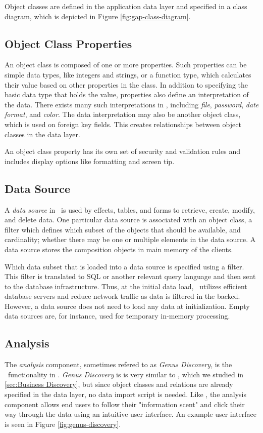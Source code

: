 Object classes are defined in the application data layer and specified in a class diagram, which is depicted in Figure \ref{fig:gap-class-diagram}.


\subsection{Object Class Properties}
\label{sub:Object Class Properties}
An object class is composed of one or more properties. Such properties can be simple data types, like integers and strings, or a function type, which calculates their value based on other properties in the class. In addition to specifying the basic data type that holds the value, properties also define an interpretation of the data. There exists many such interpretations in \gap, including \textit{file}, \textit{password}, \textit{date format}, and \textit{color}. The data interpretation may also be another object class, which is used on foreign key fields. This creates relationships between object classes in the data layer.

An object class property has its own set of security and validation rules and includes display options like formatting and screen tip.

\subsection{Data Source}
\label{sub:Data Source}
A \textit{data source} in \gap~is used by effects, tables, and forms to retrieve, create, modify, and delete data. One particular data source is associated with an object class, a filter which defines which subset of the objects that should be available, and cardinality; whether there may be one or multiple elements in the data source. A data source stores the composition objects in main memory of the clients.

Which data subset that is loaded into a data source is specified using a filter. This filter is translated to SQL or another relevant query language and then sent to the database infrastructure. Thus, at the initial data load, \gap~utilizes efficient database servers and reduce network traffic as data is filtered in the backed. However, a data source does not need to load any data at initialization. Empty data sources are, for instance, used for temporary in-memory processing.

\subsection{Analysis}
\label{sub:Analysis}
The \textit{analysis} component, sometimes refered to as \textit{Genus Discovery}, is the \bd~functionality in \gap. \textit{Genus Discovery} is is very similar to \qlikview, which we studied in \ref{sec:Business Discovery}, but since object classes and relations are already specified in the data layer, no data import script is needed. Like \qlikview, the analysis component allows end users to follow their "information scent" and click their way through the data using an intuitive user interface. An example user interface is seen in Figure \ref{fig:genus-discovery}.

